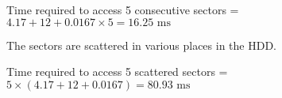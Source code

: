 \documentclass[answers]{exam}
\begin{document}
\begin{questions}
\begin{parts}
\begin{subparts}
            \begin{solution}
                Time required to access 5 consecutive sectors = 
                $4.17+12+0.0167 \times 5 = \boxed{16.25 \text{ ms}}$
            \end{solution}

            \subpart The sectors are scattered in various places in the HDD.

            \begin{solution}
                Time required to access 5 scattered sectors =
                $5 \times (4.17+12 + 0.0167) = \boxed{80.93 \text{ ms}}$
            \end{solution}

        \end{subparts}

    \end{parts}
    
\end{questions}
\end{document}
